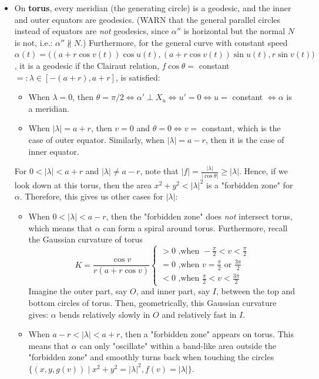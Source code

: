 \begin{itemize}
    \item On \textbf{torus}, every meridian (the generating circle) is a geodesic, and the inner and outer equators are geodesics. (WARN that the general parallel circles instead of equators are \textit{not} geodesics, since $\alpha''$ is horizontal but the normal $N$ is not, i.e.: $\alpha'' \nparallel N$.) Furthermore, for the general curve with constant speed $\alpha(t)= \big((a+r\cos v(t))\cos u(t), (a+r\cos v(t)) \sin u(t), r\sin v(t)\big)$, it is a geodesic if the Clairaut relation, $f\cos \theta=$ constant $=:\lambda \in [-(a+r),a+r]$, is satisfied:
    \begin{itemize}
        \item When $\lambda=0$, then $\theta=\pi/2 \Leftrightarrow \alpha' \perp X_u \Leftrightarrow u'=0 \Leftrightarrow u=$ constant $\Leftrightarrow \alpha$ is a meridian.
        \item When $|\lambda|=a+r$, then $v=0$ and $\theta=0 \Leftrightarrow v=$ constant, which is the case of outer equator. Similarly, when $|\lambda|=a-r$, then it is the case of inner equator.
    \end{itemize}
    \noindent For $0<|\lambda|<a+r$ and $|\lambda|\neq a-r$, note that $|f| = \frac{|\lambda|}{|\cos \theta|} \geq |\lambda|$. Hence, if we look down at this torus, then the area $x^2+y^2 <|\lambda|^2$ is a "forbidden zone" for $\alpha$. Therefore, this gives us other cases for $|\lambda|$:
    \begin{itemize}
        \item When $0<|\lambda|<a-r$, then the "forbidden zone" does \textit{not} intersect torus, which means that $\alpha$ can form a spiral around torus. Furthermore, recall the Gaussian curvature of torus
        \[
        K=\frac{\cos v}{r(a+r\cos v)} \begin{cases}
            >0 \text{ ,when } -\frac{\pi}{2}<v<\frac{\pi}{2}\\
            =0 \text{ ,when } v=\frac{\pi}{2} \text{ or } \frac{3\pi}{2}\\
            <0 \text{ ,when } \frac{\pi}{2}<v <\frac{3\pi}{2}
        \end{cases}
        \]
        Imagine the outer part, say $O$, and inner part, say $I$, between the top and bottom circles of torus. Then, geometrically, this Gaussian curvature gives: $\alpha$ bends relatively slowly in $O$ and relatively fast in $I$.
        \item When $a-r<|\lambda|<a+r$, then a "forbidden zone" appears on torus. This means that $\alpha$ can only "oscillate" within a band-like area outside the "forbidden zone" and smoothly turns back when touching the circles $\{ (x,y,g(v)) \mid x^2+y^2= |\lambda|^2, f(v)=|\lambda|\}$.
    \end{itemize}
    

\end{itemize}
